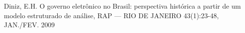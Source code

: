 \documentclass[
12pt,		%
openright,	%
twoside,  %
a4paper,			%
chapter=TITLE,		%
english,			%
french,				%
spanish,			%
brazil				%
]{USPSC-classe/USPSC}
\begin{document}
\begin{flushleft}
\begin{flushleft}
\begin{flushleft}
\begin{flushleft}
\begin{flushleft}
\begin{flushleft}
\begin{flushleft}
\begin{flushleft}
\begin{flushleft}
\begin{flushleft}
[DINIZ, 2009] Diniz, E.H. O governo eletr\^onico no Brasil: perspectiva hist\'orica a partir de um modelo estruturado de an\'alise, RAP — RIO DE JANEIRO 43(1):23-48, JAN./FEV. 2009
\end{flushleft}


\end{flushleft}


\end{flushleft}


\end{flushleft}


\end{flushleft}


\end{flushleft}


\end{flushleft}


\end{flushleft}


\end{flushleft}


\end{flushleft}
\end{document}

